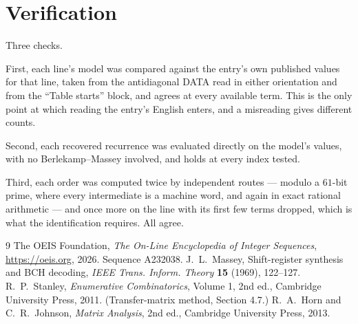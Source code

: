 \documentclass[11pt,a4paper]{article}
\theoremstyle{plain}
\theoremstyle{definition}
\begin{document}
\section{Verification}

Three checks.

First, each line's model was compared against the entry's own published values for that line,
taken from the antidiagonal DATA read in either orientation and from the ``Table starts''
block, and agrees at every available term. This is the only point at which reading the entry's
English enters, and a misreading gives different counts.

Second, each recovered recurrence was evaluated directly on the model's values, with no
Berlekamp--Massey involved, and holds at every index tested.

Third, each order was computed twice by independent routes --- modulo a $61$-bit prime, where
every intermediate is a machine word, and again in exact rational arithmetic --- and once more
on the line with its first few terms dropped, which is what the identification requires. All
agree.

\begin{thebibliography}{9}
 The OEIS Foundation, \emph{The On-Line Encyclopedia of Integer
Sequences}, \url{https://oeis.org}, 2026. Sequence A232038.
 J.~L.~Massey, Shift-register synthesis and BCH decoding, \emph{IEEE
Trans. Inform. Theory} \textbf{15} (1969), 122--127.
 R.~P.~Stanley, \emph{Enumerative Combinatorics}, Volume 1, 2nd ed.,
Cambridge University Press, 2011. (Transfer-matrix method, Section 4.7.)
 R.~A.~Horn and C.~R.~Johnson, \emph{Matrix Analysis}, 2nd ed., Cambridge
University Press, 2013.
\end{thebibliography}
\end{document}
